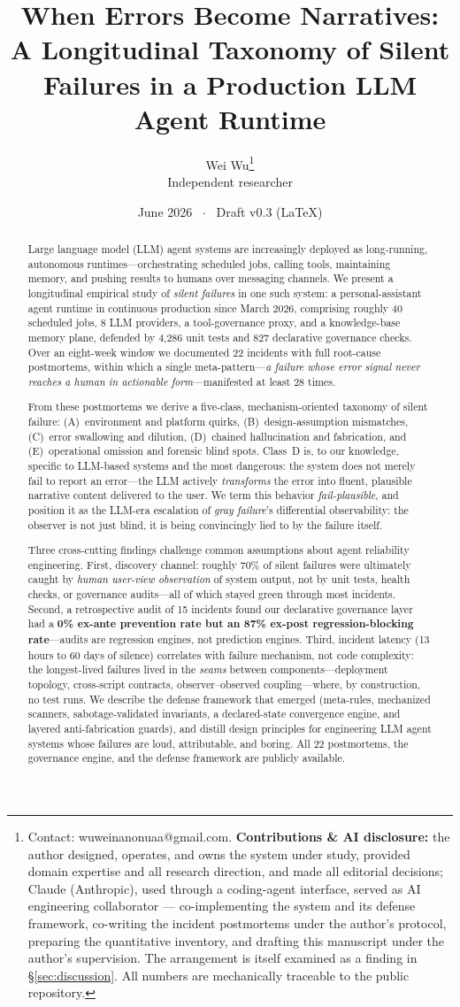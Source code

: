 \documentclass[11pt]{article}
\title{\textbf{When Errors Become Narratives: A Longitudinal Taxonomy of
Silent Failures in a Production LLM Agent Runtime}}
\author{%
  Wei Wu\thanks{Contact: wuweinanonuaa@gmail.com. \quad
  \textbf{Contributions \& AI disclosure:} the author designed, operates,
  and owns the system under study, provided domain expertise and all
  research direction, and made all editorial decisions; Claude
  (Anthropic), used through a coding-agent interface, served as AI
  engineering collaborator --- co-implementing the system and its defense
  framework, co-writing the incident postmortems under the author's
  protocol, preparing the quantitative inventory, and drafting this
  manuscript under the author's supervision. The arrangement is itself
  examined as a finding in \S\ref{sec:discussion}. All numbers are
  mechanically traceable to the public repository.}\\
  \small Independent researcher}
\date{June 2026 ~$\cdot$~ Draft v0.3 (LaTeX)}
\newcommand{\failplausible}{\emph{fail-plausible}}
\newcommand{\classref}[1]{Class~#1}
\begin{document}
\maketitle

\begin{abstract}
\noindent
Large language model (LLM) agent systems are increasingly deployed as
long-running, autonomous runtimes---orchestrating scheduled jobs, calling
tools, maintaining memory, and pushing results to humans over messaging
channels. We present a longitudinal empirical study of \emph{silent
failures} in one such system: a personal-assistant agent runtime in
continuous production since March 2026, comprising roughly 40 scheduled
jobs, 8 LLM providers, a tool-governance proxy, and a knowledge-base
memory plane, defended by 4{,}286 unit tests and 827 declarative
governance checks. Over an eight-week window we documented 22 incidents
with full root-cause postmortems, within which a single
meta-pattern---\emph{a failure whose error signal never reaches a human
in actionable form}---manifested at least 28 times.

From these postmortems we derive a five-class, mechanism-oriented
taxonomy of silent failure: (A)~environment and platform quirks,
(B)~design-assumption mismatches, (C)~error swallowing and dilution,
(D)~chained hallucination and fabrication, and (E)~operational omission
and forensic blind spots. \classref{D} is, to our knowledge, specific to
LLM-based systems and the most dangerous: the system does not merely fail
to report an error---the LLM actively \emph{transforms} the error into
fluent, plausible narrative content delivered to the user. We term this
behavior \failplausible{}, and position it as the LLM-era escalation of
\emph{gray failure}'s differential observability: the observer is not
just blind, it is being convincingly lied to by the failure itself.

Three cross-cutting findings challenge common assumptions about agent
reliability engineering. First, discovery channel: roughly 70\% of silent
failures were ultimately caught by \emph{human user-view observation} of
system output, not by unit tests, health checks, or governance
audits---all of which stayed green through most incidents. Second, a
retrospective audit of 15 incidents found our declarative governance
layer had a \textbf{0\% ex-ante prevention rate but an 87\% ex-post
regression-blocking rate}---audits are regression engines, not prediction
engines. Third, incident latency (13 hours to 60 days of silence)
correlates with failure mechanism, not code complexity: the longest-lived
failures lived in the \emph{seams} between components---deployment
topology, cross-script contracts, observer--observed coupling---where, by
construction, no test runs. We describe the defense framework that
emerged (meta-rules, mechanized scanners, sabotage-validated invariants,
a declared-state convergence engine, and layered anti-fabrication
guards), and distill design principles for engineering LLM agent systems
whose failures are loud, attributable, and boring. All 22 postmortems,
the governance engine, and the defense framework are publicly available.
\end{abstract}
\end{document}
